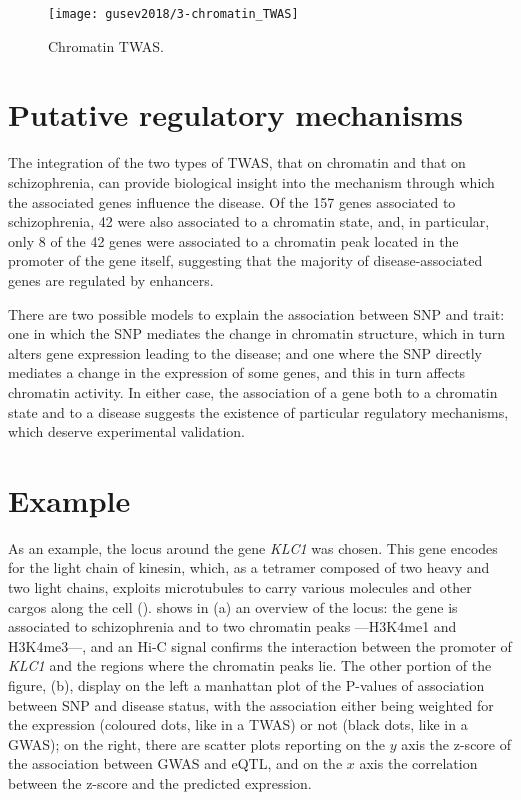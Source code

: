 \documentclass[../main.tex]{subfiles}
\begin{document}
\begin{figure}
	\texttt{[image: gusev2018/3-chromatin\_TWAS]}
	\caption{Chromatin TWAS.}
\end{figure}

\section{Putative regulatory mechanisms}

The integration of the two types of TWAS, that on chromatin and that on 
schizophrenia, can provide biological insight into the mechanism through 
which the associated genes influence the disease. Of the 157 genes 
associated to schizophrenia, 42 were also associated to a chromatin 
state, and, in particular, only 8 of the 42 genes were associated to a 
chromatin peak located in the promoter of the gene itself, suggesting 
that the majority of disease-associated genes are regulated by 
enhancers.

There are two possible models to explain the association between SNP and 
trait: one in which the SNP mediates the change in chromatin structure, 
which in turn alters gene expression leading to the disease; and one 
where the SNP directly mediates a change in the expression of some 
genes, and this in turn affects chromatin activity. In either case, the 
association of a gene both to a chromatin state and to a disease 
suggests the existence of particular regulatory mechanisms, which 
deserve experimental validation.

\section{Example}

As an example, the locus around the gene \textit{KLC1} was chosen. This 
gene encodes for the light chain of kinesin, which, as a tetramer 
composed of two heavy and two light chains, exploits microtubules to 
carry various molecules and other cargos along the cell 
().  shows in (a) an 
overview of the locus: the gene is associated to schizophrenia and to 
two chromatin peaks ---H3K4me1 and H3K4me3---, and an Hi-C signal 
confirms the interaction between the promoter of \textit{KLC1} and the 
regions where the chromatin peaks lie. The other portion of the figure, 
(b), display on the left a manhattan plot of the P-values of association 
between SNP and disease status, with the association either being 
weighted for the expression (coloured dots, like in a TWAS) or not 
(black dots, like in a GWAS); on the right, there are scatter plots 
reporting on the $y$ axis the z-score of the association between GWAS 
and eQTL, and on the $x$ axis the correlation between the z-score and 
the predicted expression.
\end{document}
